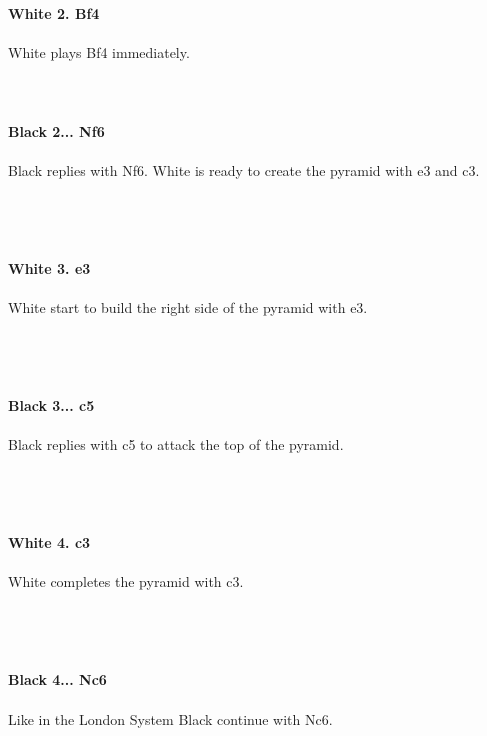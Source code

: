 \documentclass{article}
\begin{document}

\\
\\
\textbf{White 2. Bf4}\\
\\
White plays Bf4 immediately.\\
\\

\\
\\
\textbf{Black 2... Nf6}\\
\\
Black replies with Nf6. White is ready to create the pyramid with e3 and c3.\\\\
\\

\\
\\
\textbf{White 3. e3}\\
\\
White start to build the right side of the pyramid with e3.\\\\
\\

\\
\\
\textbf{Black 3... c5}\\
\\
Black replies with c5 to attack the top of the pyramid.\\\\
\\

\\
\\
\textbf{White 4. c3}\\
\\
White completes the pyramid with c3.\\\\
\\

\\
\\
\textbf{Black 4... Nc6}\\
\\
Like in the London System Black continue with Nc6.\\\\
\\

\end{document}
